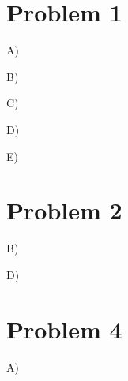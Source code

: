 \documentclass{6160}
\author{Ben Bitdiddle}
\begin{document}
\section*{Problem 1}

A) 

B)

C)

D)

E)

\newpage
\section*{Problem 2}

B)

D)

\newpage
\section*{Problem 4}

A)
\end{document}
